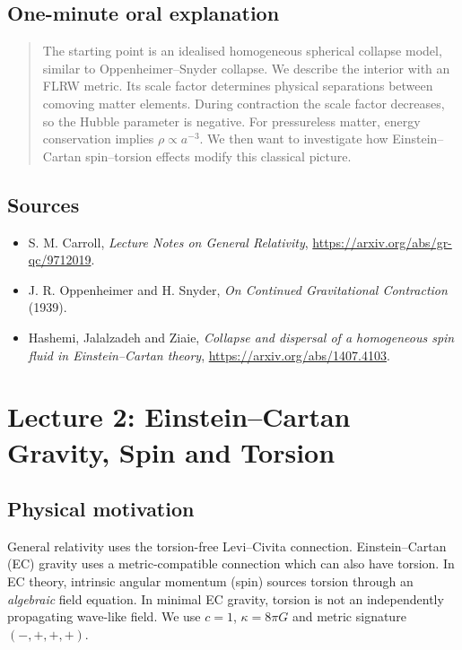 \documentclass[11pt,a4paper]{article}
\begin{document}
\subsection{One-minute oral explanation}
\begin{quote}
The starting point is an idealised homogeneous spherical collapse model, similar to Oppenheimer--Snyder collapse. We describe the interior with an FLRW metric. Its scale factor determines physical separations between comoving matter elements. During contraction the scale factor decreases, so the Hubble parameter is negative. For pressureless matter, energy conservation implies $\rho\propto a^{-3}$. We then want to investigate how Einstein--Cartan spin--torsion effects modify this classical picture.
\end{quote}
\subsection{Sources}
\begin{itemize}
\item S. M. Carroll, \emph{Lecture Notes on General Relativity}, \url{https://arxiv.org/abs/gr-qc/9712019}.
\item J. R. Oppenheimer and H. Snyder, \emph{On Continued Gravitational Contraction} (1939).
\item Hashemi, Jalalzadeh and Ziaie, \emph{Collapse and dispersal of a homogeneous spin fluid in Einstein--Cartan theory}, \url{https://arxiv.org/abs/1407.4103}.
\end{itemize}
\section{Lecture 2: Einstein--Cartan Gravity, Spin and Torsion}
\subsection{Physical motivation}
General relativity uses the torsion-free Levi--Civita connection. Einstein--Cartan (EC) gravity uses a metric-compatible connection which can also have torsion. In EC theory, intrinsic angular momentum (spin) sources torsion through an \emph{algebraic} field equation. In minimal EC gravity, torsion is not an independently propagating wave-like field. We use $c=1$, $\kappa=8\pi G$ and metric signature $(-,+,+,+)$.
\end{document}
